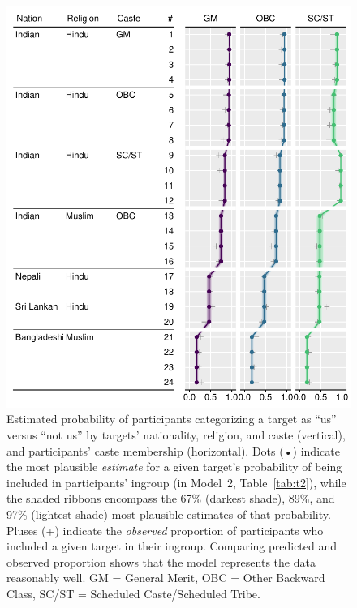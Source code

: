 \documentclass[12pt, a4paper]{article}
\begin{document}
\begin{figure}
\centering
\includegraphics[scale=1]{../figures/figure-3}
\caption{
Estimated probability of participants categorizing a target as ``us'' versus ``not us'' by targets' nationality, religion, and caste (vertical), and participants' caste membership (horizontal). Dots (•) indicate the most plausible \emph{estimate} for a given target's probability of being included in participants' ingroup (in Model~2, Table~\ref{tab:t2}), while the shaded ribbons encompass the 67\% (darkest shade), 89\%, and 97\% (lightest shade) most plausible estimates of that probability. Pluses (+) indicate the \emph{observed} proportion of participants who included a given target in their ingroup. Comparing predicted and observed proportion shows that the model represents the data reasonably well. GM = General Merit, OBC = Other Backward Class, SC/ST = Scheduled Caste/Scheduled Tribe.
}
\label{fig:f3}
\end{figure}
\end{document}
